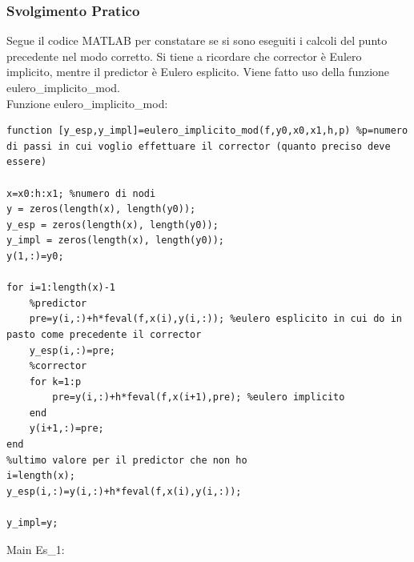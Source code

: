 \documentclass[11pt]{article}
\begin{document}
\subsubsection{Svolgimento Pratico}
Segue il codice MATLAB per constatare se si sono eseguiti i calcoli del punto precedente nel modo corretto. Si tiene a ricordare che corrector è Eulero implicito, mentre il predictor è Eulero esplicito. Viene fatto uso della funzione eulero\_implicito\_mod.\\
Funzione eulero\_implicito\_mod:\\
\begin{lstlisting}
function [y_esp,y_impl]=eulero_implicito_mod(f,y0,x0,x1,h,p) %p=numero di passi in cui voglio effettuare il corrector (quanto preciso deve essere)

x=x0:h:x1; %numero di nodi
y = zeros(length(x), length(y0));
y_esp = zeros(length(x), length(y0));
y_impl = zeros(length(x), length(y0));
y(1,:)=y0;

for i=1:length(x)-1
    %predictor
    pre=y(i,:)+h*feval(f,x(i),y(i,:)); %eulero esplicito in cui do in pasto come precedente il corrector
    y_esp(i,:)=pre;
    %corrector
    for k=1:p
        pre=y(i,:)+h*feval(f,x(i+1),pre); %eulero implicito
    end
    y(i+1,:)=pre;
end
%ultimo valore per il predictor che non ho
i=length(x);
y_esp(i,:)=y(i,:)+h*feval(f,x(i),y(i,:)); 
   
y_impl=y;
\end{lstlisting}
Main Es\_1:\\
\end{document}
